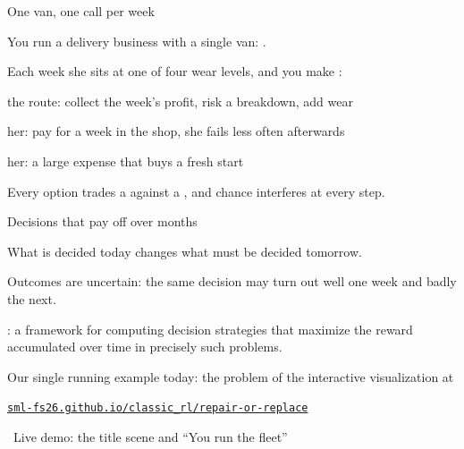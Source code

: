 
\newcommand{\demoref}[1]{\vfill\begin{flushright}{\footnotesize\color{black!60}\ding{229}~Live demo: #1}\end{flushright}}
\newcommand{\vizurl}{\href{https://sml-fs26.github.io/classic_rl/repair-or-replace/}{\texttt{sml-fs26.github.io/classic\_rl/repair-or-replace}}}
\newcommand{\statename}[1]{\textsc{#1}}


\begin{frame}{One van, one call per week}
\begin{bullets}
\item You run a delivery business with a single van: .
\pause
\item Each week she sits at one of four wear levels, and you make :
\begin{bullets}
\item {} the route: collect the week's profit, risk a breakdown, add wear
\item {} her: pay for a week in the shop, she fails less often afterwards
\item {} her: a large expense that buys a fresh start
\end{bullets}
\pause
\item Every option trades a  against a , and chance interferes at every step.
\end{bullets}
\end{frame}

\begin{frame}{Decisions that pay off over months}
\begin{bullets}
\item What is decided today changes what must be decided tomorrow.
\item Outcomes are uncertain: the same decision may turn out well one week and badly the next.
\pause
\item {}: a framework for computing decision strategies that maximize the reward accumulated over time in precisely such problems.
\pause
\item Our single running example today: the  problem of the interactive visualization at\\[1mm]
\centerline{\vizurl}
\end{bullets}
\demoref{the title scene and ``You run the fleet''}
\end{frame}

